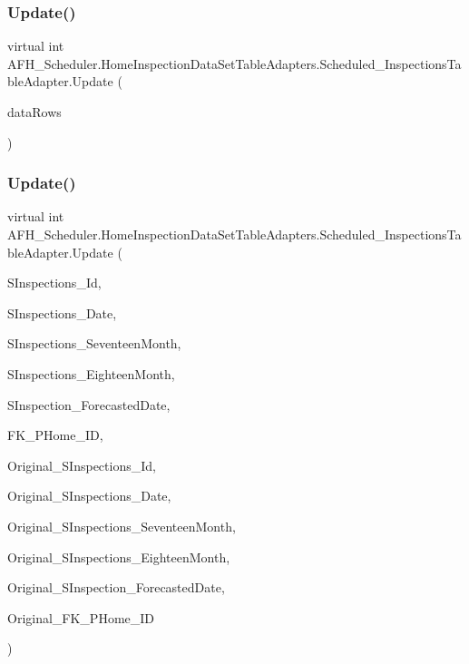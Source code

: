 \subsubsection{Update()\hspace{0.1cm}{\footnotesize\ttfamily [4/6]}}
{\footnotesize\ttfamily virtual int A\+F\+H\+\_\+\+Scheduler.\+Home\+Inspection\+Data\+Set\+Table\+Adapters.\+Scheduled\+\_\+\+Inspections\+Table\+Adapter.\+Update (\begin{DoxyParamCaption}\item[{global\+::\+System.\+Data.\+Data\+Row [$\,$]}]{data\+Rows }\end{DoxyParamCaption})\hspace{0.3cm}{\ttfamily [virtual]}}

\mbox{\label{class_a_f_h___scheduler_1_1_home_inspection_data_set_table_adapters_1_1_scheduled___inspections_table_adapter_a0cc483c7a83e63be14c775af49266591}} 
\subsubsection{Update()\hspace{0.1cm}{\footnotesize\ttfamily [5/6]}}
{\footnotesize\ttfamily virtual int A\+F\+H\+\_\+\+Scheduler.\+Home\+Inspection\+Data\+Set\+Table\+Adapters.\+Scheduled\+\_\+\+Inspections\+Table\+Adapter.\+Update (\begin{DoxyParamCaption}\item[{long}]{S\+Inspections\+\_\+\+Id,  }\item[{string}]{S\+Inspections\+\_\+\+Date,  }\item[{string}]{S\+Inspections\+\_\+\+Seventeen\+Month,  }\item[{string}]{S\+Inspections\+\_\+\+Eighteen\+Month,  }\item[{string}]{S\+Inspection\+\_\+\+Forecasted\+Date,  }\item[{global\+::\+System.\+Nullable$<$ long $>$}]{F\+K\+\_\+\+P\+Home\+\_\+\+ID,  }\item[{long}]{Original\+\_\+\+S\+Inspections\+\_\+\+Id,  }\item[{string}]{Original\+\_\+\+S\+Inspections\+\_\+\+Date,  }\item[{string}]{Original\+\_\+\+S\+Inspections\+\_\+\+Seventeen\+Month,  }\item[{string}]{Original\+\_\+\+S\+Inspections\+\_\+\+Eighteen\+Month,  }\item[{string}]{Original\+\_\+\+S\+Inspection\+\_\+\+Forecasted\+Date,  }\item[{global\+::\+System.\+Nullable$<$ long $>$}]{Original\+\_\+\+F\+K\+\_\+\+P\+Home\+\_\+\+ID }\end{DoxyParamCaption})\hspace{0.3cm}{\ttfamily [virtual]}}

